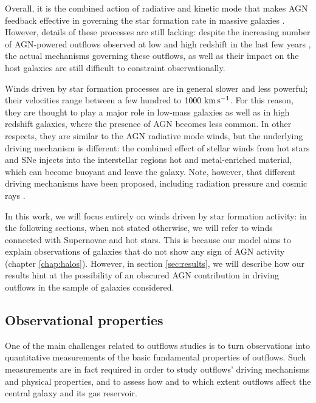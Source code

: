 Overall, it is the combined action of radiative and kinetic mode that makes AGN feedback effective in governing the star formation rate in massive galaxies \citep{fabian12}. However, details of these processes are still lacking: despite the increasing number of AGN-powered outflows observed at low and high redshift in the last few years \citep{feruglio2010quasar, maiolino2012evidence, carniani2015ionised,Fiore_2017, cicone2018largely}, the actual mechanisms governing these outflows, as well as their impact on the host galaxies are still difficult to constraint observationally.  

Winds driven by star formation processes are in general slower and less powerful; their velocities range between a few hundred to $1000\,\,\rm km\,s^{-1}$. For this reason, they are thought to play a major role in low-mass galaxies as well as in high redshift galaxies, where the presence of AGN becomes less common. In other respects, they are similar to the AGN radiative mode winds, but the underlying driving mechanism is different: the combined effect of stellar winds from hot stars and SNe injects into the interstellar regions hot and metal-enriched material, which can become buoyant and leave the galaxy. Note, however, that different driving mechanisms have been proposed, including radiation pressure and cosmic rays \citep[e.g.,][]{recchia_cosmic_rays, zhang_rad_pressure}.

In this work, we will focus entirely on winds driven by star formation activity: in the following sections, when not stated otherwise, we will refer to winds connected with Supernovae and hot stars. This is because our model aims to explain observations of galaxies that do not show any sign of AGN activity (chapter \ref{chap:halos}). However, in section \ref{sec:results}, we will describe how our results hint at the possibility of an obscured AGN contribution in driving outflows in the sample of galaxies considered. 




\subsection{Observational properties} \label{sec:obs_outflows}

One of the main challenges related to outflows studies is to turn observations into quantitative measurements of the basic fundamental properties of outflows. Such measurements are in fact required in order to study outflows' driving mechanisms and physical properties, and to assess how and to which extent outflows affect the central galaxy and its gas reservoir. 


